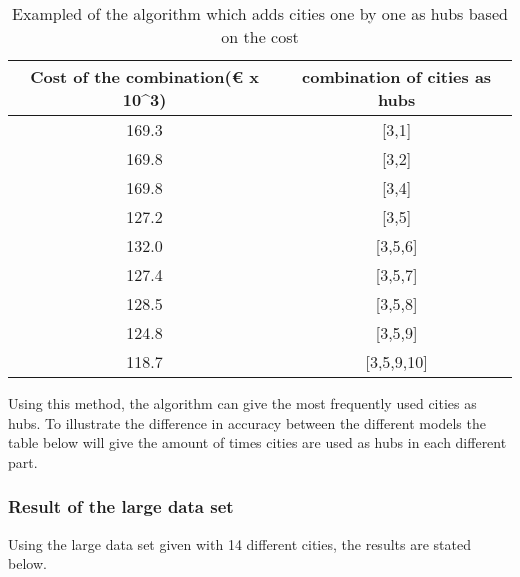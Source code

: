 \documentclass{article}
\begin{document}
    \begin{table}[h!]
        \begin{center}
            \begin{tabular}{||c |c||} 
                \hline
                Cost of the combination(€ x 10^3) & combination of cities as hubs \\ [0.5ex] 
                \hline
                \hline
                169.3 & [3,1]  \\ 
                \hline
                169.8 & [3,2]  \\
                \hline
                169.8 & [3,4]  \\
                \hline
                127.2 & [3,5]  \\ 
                \hline
                132.0 & [3,5,6]  \\
                \hline
                127.4 & [3,5,7]  \\
                \hline
                128.5 & [3,5,8]  \\
                \hline
                124.8 & [3,5,9]  \\
                \hline
                118.7 & [3,5,9,10]  \\
                [1ex] 
                \hline
              \end{tabular}
          \end{center}
        \caption{Exampled of the algorithm which adds cities one by one as hubs based on the cost}
        \label{Collection Algorithm}
    \end{table}

    Using this method, the algorithm can give the most frequently used cities as hubs. To illustrate the difference in accuracy between the different models the table below will give the amount of times cities are used as hubs in each different part.%
    
        \subsubsection{Result of the large data set}
    
            Using the large data set given with 14 different cities, the results are stated below. 
    
\end{document}
